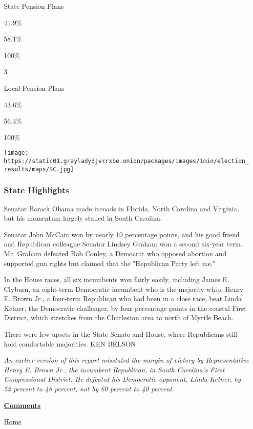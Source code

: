 State Pension Plans

41.9\%

58.1\%

100\%

3

Local Pension Plans

43.6\%

56.4\%

100\%

\texttt{[image: https://static01.graylady3jvrrxbe.onion/packages/images/1min/election\_results/maps/SC.jpg]}

\hypertarget{state-highlights}{%
\subsubsection{State Highlights}\label{state-highlights}}

Senator Barack Obama made inroads in Florida, North Carolina and
Virginia, but his momentum largely stalled in South Carolina.

Senator John McCain won by nearly 10 percentage points, and his good
friend and Republican colleague Senator Lindsey Graham won a second
six-year term. Mr. Graham defeated Bob Conley, a Democrat who opposed
abortion and supported gun rights but claimed that the "Republican Party
left me."

In the House races, all six incumbents won fairly easily, including
James E. Clyburn, an eight-term Democratic incumbent who is the majority
whip. Henry E. Brown Jr., a four-term Republican who had been in a close
race, beat Linda Ketner, the Democratic challenger, by four percentage
points in the coastal First District, which stretches from the
Charleston area to north of Myrtle Beach.

There were few upsets in the State Senate and House, where Republicans
still hold comfortable majorities. KEN BELSON

\emph{An earlier version of this report misstated the margin of victory
by Representative Henry E. Brown Jr., the incumbent Republican, in South
Carolina's First Congressional District. He defeated his Democratic
opponent, Linda Ketner, by 52 percent to 48 percent, not by 60 percent
to 40 percent.}

\textbf{\href{//community.nytimes3xbfgragh.onion/external/comments/www.stg.nytimes3xbfgragh.onion/elections/2008/results/states/south-carolina.html}{Comments}}

\href{//www.nytimes3xbfgragh.onion}{Home}

